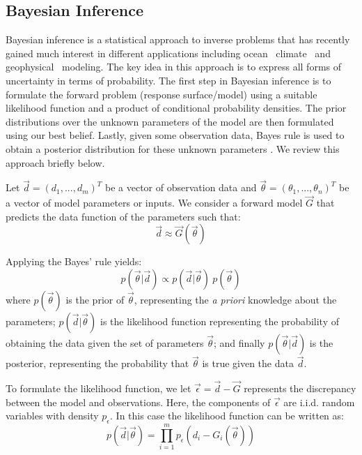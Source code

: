 \subsection{Bayesian Inference}
 \label{sec:inference}
 
Bayesian inference is a statistical approach to inverse problems
that has recently gained much interest in different applications including
ocean~\citep{Alexanderian2011a,Zedler2012,sraj:2013a}
climate~\citep{OlsonEtAl2012} and geophysical~\citep{Malinverno2002} modeling.
The key idea in this approach is to express all forms of uncertainty
in terms of probability. The first step in Bayesian inference 
is to formulate the forward problem (response surface/model) using 
a suitable likelihood function and a product of conditional probability densities. 
The prior distributions over the unknown parameters of the model
are then formulated using our best belief. Lastly, given some observation data, Bayes rule 
is used to obtain a posterior distribution for these unknown parameters
\citep{sivia}. We review this approach briefly below.

Let $\vec{d}=(d_1,...,d_m)^T$ be a vector of observation data and $\vec{\theta}=(\theta_1,...,\theta_n)^T$ be a vector of model parameters or inputs. We consider a forward model $\vec G$ that predicts the data function of 
the parameters such that:
\begin{equation}
\vec d \approx \vec{G}( \vec \theta)
\end{equation}


Applying the Bayes' rule yields:
\begin{equation}
 p(\vec{\theta}| \vec d) \propto 
 p(\vec d | \vec{\theta}) \ p(\vec{\theta})  
\label{eq:bayes}
\end{equation}
where $p(\vec{\theta})$ is the prior of $\vec{\theta}$, representing the \emph{a priori} knowledge
about the parameters; 
$p(\vec d| \vec{\theta})$ is the likelihood function representing
the probability of obtaining the data given the set of parameters $\vec{\theta}$;
and finally $p(\vec{\theta}| \vec d)$ is the posterior,
representing the probability that $\vec{\theta}$ is true given the data $\vec d $.

To formulate the likelihood function, we let $\vec \epsilon = \vec d - \vec{G}$
represents the discrepancy between the model and observations.
Here, the components of $\vec \epsilon $ are i.i.d. random variables with density $p_{\epsilon}$.
In this case the likelihood function can be written as:
\begin{equation} 
p(\vec d |  \vec{\theta}) 
= 
\prod_{i=1}^m  
p_\epsilon (d_i - G_i(\vec \theta))  	
\label{eq:likelihood}
\end{equation}

